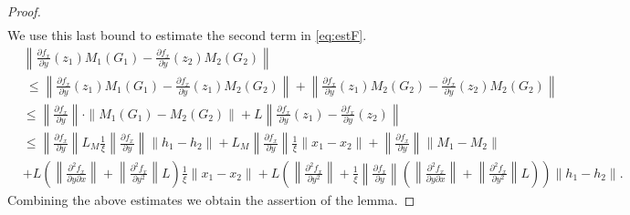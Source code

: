 \documentclass[11pt, leqno]{amsart}
\theoremstyle{definition}
\begin{document}
\begin{proof}
\begin{align*}
\end{align*}
We use this last bound to estimate the second term in \eqref{eq:estF}. 
\begin{align}\label{diffM}
 & \left\|
   \frac{\partial f_x}{\partial y}(z_1)M_1(G_1) - \frac{\partial f_x}{\partial y}(z_2)M_2(G_2) \right\|  \\
  &\ \leq  \left\|
   \frac{\partial f_x}{\partial y}(z_1)M_1(G_1) - \frac{\partial f_x}{\partial y}(z_1)M_2(G_2) \right\| 
   +  \left\|
   \frac{\partial f_x}{\partial y}(z_1)M_2(G_2) - \frac{\partial f_x}{\partial y}(z_2)M_2(G_2) \right\|\nonumber\\
 &  \leq \left\|\frac{\partial f_x}{\partial y}\right\| \cdot \|M_1(G_1) - M_2(G_2)\| + L \left\| \frac{\partial f_x}{\partial y}(z_1) - \frac{\partial f_x}{\partial y}(z_2) \right\| \nonumber \\
     & \leq \left\|\frac{\partial f_x}{\partial y}\right\| L_M\frac{1}{\xi}\left\|\frac{\partial f_x}{\partial y}\right\|\|h_1-h_2\| + L_M\left\|\frac{\partial f_x}{\partial y}\right\| \frac{1}{\xi}\|x_1-x_2\|+ \left\|\frac{\partial f_x}{\partial y}\right\| \|M_1-M_2\|\nonumber\\
    & +  L \left( \left\| \frac{\partial^2 f_x}{\partial y \partial x}\right\|  +  \left\| \frac{\partial^2 f_x}{\partial y^2}\right\| L  \right)  \frac{1}{\xi} \|x_1 - x_2\| + L \left(\left\| \frac{\partial^2 f_x}{ \partial y^2}\right\|+\frac{1}{\xi}\left\|\frac{\partial f_x}{\partial y}\right\|\left( \left\| \frac{\partial^2 f_x}{\partial y \partial x}\right\|  +  \left\| \frac{\partial^2 f_x}{\partial y^2}\right\| L  \right)\right) \|h_1-h_2\|.\nonumber
\end{align}
Combining the above estimates we obtain the assertion of the lemma.
\end{proof}
\end{document}

